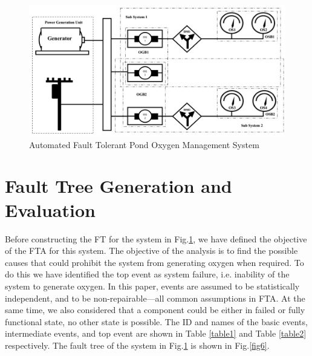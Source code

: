 \documentclass[10pt]{llncs}
\begin{document}
\begin{figure}[thpb]
      \centering
   
			\includegraphics[scale=0.45]{pond_system1}
 	 
      \caption{Automated Fault Tolerant Pond Oxygen Management System}
      \label{fig5}
   \end{figure}	
	


	
\section{ Fault Tree Generation and Evaluation}
\label{sec:4}
Before constructing the FT for the system in Fig.\ref{fig5}, we have defined the objective of the FTA for this system. The objective of the analysis is to find the possible causes that could prohibit the system from generating oxygen when required. To do this we have identified the top event as system failure, i.e. inability of the system to generate oxygen. In this paper, events are assumed to be statistically independent, and to be non-repairable---all common assumptions in FTA. At the same time, we also considered that a component could be either in failed or fully functional state, no other state is possible. The ID and names of the basic events, intermediate events, and top event are shown in Table \ref{table1} and Table \ref{table2} respectively. The fault tree of the system in Fig.\ref{fig5} is shown in Fig.\ref{fig6}.   	 
\end{document}

